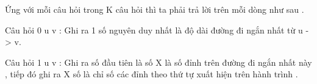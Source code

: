Ứng với mỗi câu hỏi trong K câu hỏi thì ta phải trả lời trên mỗi dòng như sau .   


   Câu hỏi 0 u v : Ghi ra 1 số nguyên duy nhất là độ dài đường đi ngắn nhất từ u -> v.   


   Câu hỏi 1 u v : Ghi ra số đầu tiên là số X là số đỉnh trên đường đi ngắn nhất này , tiếp đó ghi ra X số là chỉ số các đỉnh theo thứ tự xuất hiện trên hành trình .